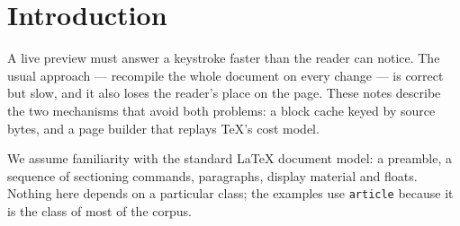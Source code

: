 \section{Introduction}\label{sec:intro}
A live preview must answer a keystroke faster than the reader can notice.
The usual approach --- recompile the whole document on every change --- is
correct but slow, and it also loses the reader's place on the page. These
notes describe the two mechanisms that avoid both problems: a block cache
keyed by source bytes, and a page builder that replays TeX's cost model.

We assume familiarity with the standard \LaTeX{} document model: a preamble,
a sequence of sectioning commands, paragraphs, display material and floats.
Nothing here depends on a particular class; the examples use
\texttt{article} because it is the class of most of the corpus.
